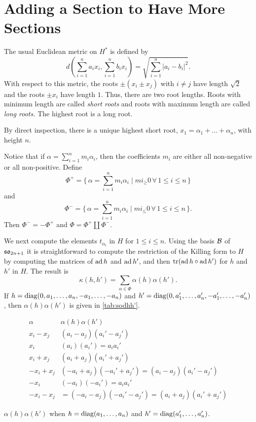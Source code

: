 \section{Adding a Section to Have More Sections}
The usual Euclidean metric on $H^*$ is defined by 
\[
d(\sum_{i=1}^n a_i x_i, \sum_{i=1}^n b_i x_i) = \sqrt{ \sum_{i=1}^n
  |a_i-b_i|^2}.
\]
With respect to this metric, the roots $\pm (x_i\pm x_j)$ with $i\ne j$ have
length $\sqrt 2$ and the roots $\pm x_i$ have length $1$. Thus, there are
two root lengths. Roots with minimum length are called \emph{short roots}
and roots with maximum length are called \emph{long roots.} The highest root
is a long root.

By direct inspection, there is a unique highest short root,
$x_1=\alpha_1+\dots +\alpha_n$, with height $n$.

Notice that if $\alpha=\sum_{i=1}^n m_i\alpha_i$, then the coefficients
$m_i$ are either all non-negative or all non-positive. Define
\[
\Phi^+=\Big\{\, \alpha=\sum_{i=1}^n m_i\alpha_i\mid mi_\geq 0 \, \forall\,
1\leq i\leq n\,\Big\}
\]
and
\[
\Phi^- = \Big\{\, \alpha=\sum_{i=1}^n m_i\alpha_i\mid mi_\leq 0 \, \forall\,
1\leq i\leq n\,\Big\}.
\]
Then $\Phi^-= -\Phi^+$ and $\Phi = \Phi^+ \coprod \Phi^-$.

We next compute the elements $t_{\alpha_i}$ in $H$ for $1\leq i\leq
n$. Using the basis ${\mathcal B}$ of $\mathfrak {so}_{2n+1}$ it is straightforward to compute
the restriction of the Killing form to $H$ by computing the matrices of $\operatorname{ad}
h$ and $\operatorname{ad} h'$, and then ${\operatorname{tr}}(\operatorname{ad} h\circ \operatorname{ad} h')$ for $h$ and $h'$ in
$H$. The result is
\[
\kappa(h,h')= \sum_{\alpha\in \Phi} \alpha(h) \alpha(h').
\]
If $h={\operatorname{diag}(0,a_1,\dots,a_n, -a_1,\dots,-a_n)}$ and $h'={\operatorname{diag}(0,a'_1,\dots,a'_n, -a'_1,\dots,-a'_n)}$, then
$\alpha(h) \alpha(h')$ is given in \cref{tab:sodhh'}.
\begin{table}[h!tb]
  \small {}
  \renewcommand{\arraystretch}{1.3}
  \begin{equation*}
    \begin{array}{c|c}
      \alpha&\alpha(h) \alpha(h')\\\hline
      x_i-x_j& (a_i-a_j)(a_i'-a_j')\\
      x_i&(a_i)(a_i')= a_ia_i'\\ 
      x_i+x_j&(a_i+a_j)(a_i'+a_j')\\ 
      - x_i+x_j&(-a_i+a_j)(-a_i'+a_j')=(a_i-a_j)(a_i'-a_j')\\
      -x_i &(-a_i)(-a_i')=a_ia_i'\\ 
      -x_i-x_j&=(-a_i-a_j)(-a_i'-a_j')=(a_i+a_j)(a_i'+a_j') 
    \end{array}  
  \end{equation*}
  \caption{$\alpha(h) \alpha(h')$ when $h={\operatorname{diag}(a_1,\dots,a_n)}$ and
    $h'={\operatorname{diag}(a'_1,\dots,a'_n)}$.}
    \label{tab:sodhh'}  
\end{table}

